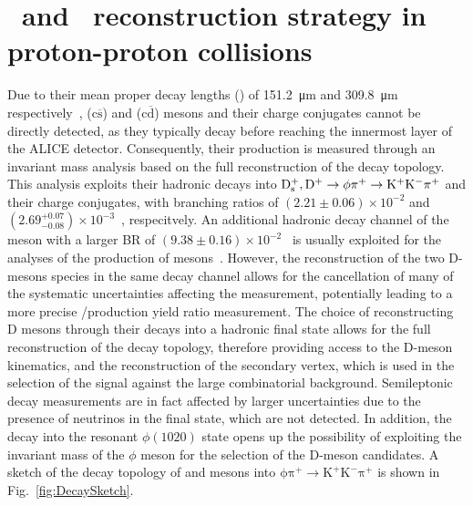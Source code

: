 \chapter{\texorpdfstring{\ds\ and \dpl\ reconstruction strategy in proton-proton collisions}{Ds+ and D+ reconstruction strategy in proton-proton collisions}}\label{chap:reconstruction}

\begin{sloppypar}
Due to their mean proper decay lengths (\ct) of \SI{151.2}{\micro\meter} and \SI{309.8}{\micro\meter} respectively~\cite{pdg}, \ds ($\mathrm{c\overline{s}}$) and \dpl ($\mathrm{c\overline{d}}$) mesons and their charge conjugates cannot be directly detected, as they typically decay before reaching the innermost layer of the ALICE detector. Consequently, their production is measured through an invariant mass analysis based on the full reconstruction of the decay topology. This analysis exploits their hadronic decays into $\mathrm{D_s^+}, \mathrm{D^+} \rightarrow \mathrm{\phi\pi^+ \rightarrow K^+K^-\pi^+}$ and their charge conjugates, with branching ratios of $(2.21\pm0.06)\times10^{-2}$ and \mbox{$(2.69^{+0.07}_{-0.08})\times10^{-3}$}~\cite{pdg}, respecitvely. An additional hadronic decay channel of the \dpl meson with a larger BR of \mbox{$(9.38\pm0.16)\times10^{-2}$}~\cite{pdg} is usually exploited for the analyses of the production of \dpl mesons~\cite{ALICE:2017olh}. However, the reconstruction of the two D-mesons species in the same decay channel allows for the cancellation of many of the systematic uncertainties affecting the measurement, potentially leading to a more precise \ds/\dpl production yield ratio measurement. The choice of reconstructing D mesons through their decays into a hadronic final state allows for the full reconstruction of the decay topology, therefore providing access to the D-meson kinematics, and the reconstruction of the secondary vertex, which is used in the selection of the signal against the large combinatorial background. Semileptonic decay measurements are in fact affected by larger uncertainties due to the presence of neutrinos in the final state, which are not detected. In addition, the decay into the resonant $\phi(1020)$ state opens up the possibility of exploiting the invariant mass of the $\phi$ meson for the selection of the D-meson candidates. A sketch of the decay topology of \ds and \dpl mesons into $\mathrm{\phi\pi^+ \rightarrow K^+K^-\pi^+}$ is shown in Fig.~\ref{fig:DecaySketch}.
\end{sloppypar}

